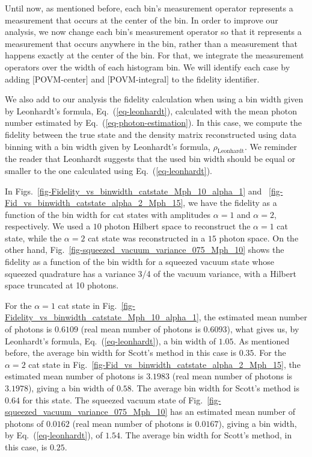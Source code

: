 \documentclass[
reprint,
superscriptaddress,
showpacs,
amsmath,
amssymb,
aps,
pra,
longbibliography
]{revtex4-1}
\begin{document}
Until now, as mentioned before, each bin's measurement operator represents a measurement that occurs at the center of the bin. In order to improve our analysis,
we now change each bin's measurement operator so that it represents a measurement that occurs anywhere in the bin, rather than a measurement that happens exactly at the center of the bin. For that, we integrate the measurement operators over the width of each histogram bin. We will identify each case by adding $[$POVM-center$]$ and $[$POVM-integral$]$ to the fidelity identifier.

We also add to our analysis the fidelity calculation when using a bin width given by Leonhardt's formula, Eq.~(\ref{eq-leonhardt}), calculated with the mean photon number estimated by Eq.~(\ref{eq-photon-estimation}). In this case, we compute the fidelity between the true state and the density matrix reconstructed using data binning with a bin width given by Leonhardt's formula, $\rho_{\mathrm{Leonhardt}}$. We reminder the reader that Leonhardt suggests that the used bin width should be equal or smaller to the one calculated using Eq.~(\ref{eq-leonhardt}). 

In Figs.~\ref{fig-Fidelity_vs_binwidth_catstate_Mph_10_alpha_1} and
~\ref{fig-Fid_vs_binwidth_catstate_alpha_2_Mph_15}, we have the fidelity
as a function of the bin width for cat states with amplitudes $\alpha=1$ and
$\alpha=2$, respectively. We used a $10$ photon Hilbert space to reconstruct the
$\alpha = 1$ cat state, while the $\alpha = 2$ cat state was reconstructed in a
$15$ photon space. On the other hand, Fig.~\ref{fig-squeezed_vacuum_variance_075_Mph_10} shows the fidelity as a function of the 
bin width for a squeezed vacuum state whose squeezed quadrature has a variance 3/4 of the vacuum variance, with a Hilbert space truncated at 10 photons.

For the $\alpha = 1$ cat state in Fig.~\ref{fig-Fidelity_vs_binwidth_catstate_Mph_10_alpha_1}, the estimated mean number of photons is $0.6109$ (real mean number of photons is $0.6093$), what gives us, by Leonhardt's formula, Eq.~(\ref{eq-leonhardt}), a bin width of $1.05$. As mentioned before, the average bin width for Scott's method in this case is $0.35$. For the $\alpha = 2$ cat state in Fig.~\ref{fig-Fid_vs_binwidth_catstate_alpha_2_Mph_15}, the estimated mean number of photons is $3.1983$ (real mean number of photons is $3.1978$), giving a bin width of $0.58$. The average bin width for Scott's method is $0.64$ for this state. The squeezed vacuum state of Fig.~\ref{fig-squeezed_vacuum_variance_075_Mph_10} has an estimated mean number of photons of
$0.0162$ (real mean number of photons is $0.0167$), giving a bin width, by Eq.~(\ref{eq-leonhardt}), of $1.54$. The average bin width for Scott's method, in this case, is $0.25$.
\end{document}
